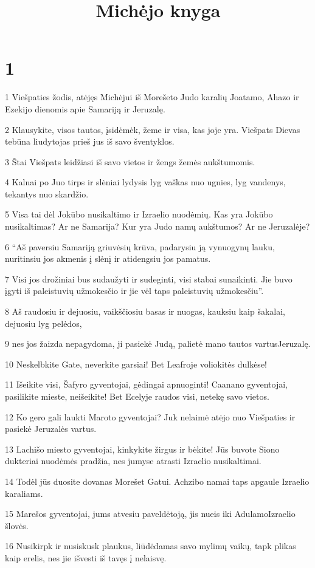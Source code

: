

\title{Michėjo knyga}

\chapter{1}


\par 1 Viešpaties žodis, atėjęs Michėjui iš Morešeto Judo karalių Joatamo, Ahazo ir Ezekijo dienomis apie Samariją ir Jeruzalę. 
\par 2 Klausykite, visos tautos, įsidėmėk, žeme ir visa, kas joje yra. Viešpats Dievas tebūna liudytojas prieš jus iš savo šventyklos. 
\par 3 Štai Viešpats leidžiasi iš savo vietos ir žengs žemės aukštumomis. 
\par 4 Kalnai po Juo tirps ir slėniai lydysis lyg vaškas nuo ugnies, lyg vandenys, tekantys nuo skardžio. 
\par 5 Visa tai dėl Jokūbo nusikaltimo ir Izraelio nuodėmių. Kas yra Jokūbo nusikaltimas? Ar ne Samarija? Kur yra Judo namų aukštumos? Ar ne Jeruzalėje? 
\par 6 “Aš paversiu Samariją griuvėsių krūva, padarysiu ją vynuogynų lauku, nuritinsiu jos akmenis į slėnį ir atidengsiu jos pamatus. 
\par 7 Visi jos drožiniai bus sudaužyti ir sudeginti, visi stabai sunaikinti. Jie buvo įgyti iš paleistuvių užmokesčio ir jie vėl taps paleistuvių užmokesčiu”. 
\par 8 Aš raudosiu ir dejuosiu, vaikščiosiu basas ir nuogas, kauksiu kaip šakalai, dejuosiu lyg pelėdos, 
\par 9 nes jos žaizda nepagydoma, ji pasiekė Judą, palietė mano tautos vartus­Jeruzalę. 
\par 10 Neskelbkite Gate, neverkite garsiai! Bet Leafroje voliokitės dulkėse! 
\par 11 Išeikite visi, Šafyro gyventojai, gėdingai apnuoginti! Caanano gyventojai, pasilikite mieste, neišeikite! Bet Ecelyje raudos visi, netekę savo vietos. 
\par 12 Ko gero gali laukti Maroto gyventojai? Juk nelaimė atėjo nuo Viešpaties ir pasiekė Jeruzalės vartus. 
\par 13 Lachišo miesto gyventojai, kinkykite žirgus ir bėkite! Jūs buvote Siono dukteriai nuodėmės pradžia, nes jumyse atrasti Izraelio nusikaltimai. 
\par 14 Todėl jūs duosite dovanas Morešet Gatui. Achzibo namai taps apgaule Izraelio karaliams. 
\par 15 Marešos gyventojai, jums atvesiu paveldėtoją, jis nueis iki Adulamo­Izraelio šlovės. 
\par 16 Nusikirpk ir nusiskusk plaukus, liūdėdamas savo mylimų vaikų, tapk plikas kaip erelis, nes jie išvesti iš tavęs į nelaisvę.


